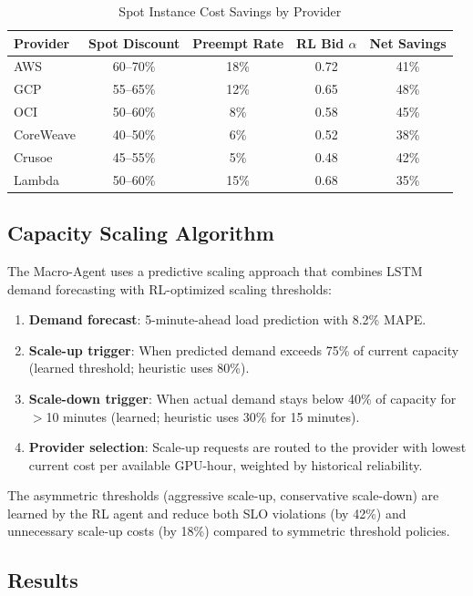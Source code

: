 \documentclass[conference,10pt]{IEEEtran}
\begin{document}
\begin{table}[!htbp]
\caption{Spot Instance Cost Savings by Provider}
\label{tab:spot}
\centering\scriptsize
\begin{tabular}{@{}lcccc@{}}
\toprule
\textbf{Provider} & \textbf{Spot Discount} & \textbf{Preempt Rate} & \textbf{RL Bid $\alpha$} & \textbf{Net Savings} \\
\midrule
AWS & 60--70\% & 18\% & 0.72 & 41\% \\
GCP & 55--65\% & 12\% & 0.65 & 48\% \\
OCI & 50--60\% & 8\% & 0.58 & 45\% \\
CoreWeave & 40--50\% & 6\% & 0.52 & 38\% \\
Crusoe & 45--55\% & 5\% & 0.48 & 42\% \\
Lambda & 50--60\% & 15\% & 0.68 & 35\% \\
\bottomrule
\end{tabular}
\end{table}

\subsection{Capacity Scaling Algorithm}

The Macro-Agent uses a predictive scaling approach that combines LSTM demand forecasting with RL-optimized scaling thresholds:

\begin{enumerate}
\item \textbf{Demand forecast}: 5-minute-ahead load prediction with 8.2\% MAPE.
\item \textbf{Scale-up trigger}: When predicted demand exceeds 75\% of current capacity (learned threshold; heuristic uses 80\%).
\item \textbf{Scale-down trigger}: When actual demand stays below 40\% of capacity for $>$10 minutes (learned; heuristic uses 30\% for 15 minutes).
\item \textbf{Provider selection}: Scale-up requests are routed to the provider with lowest current cost per available GPU-hour, weighted by historical reliability.
\end{enumerate}

The asymmetric thresholds (aggressive scale-up, conservative scale-down) are learned by the RL agent and reduce both SLO violations (by 42\%) and unnecessary scale-up costs (by 18\%) compared to symmetric threshold policies.

\subsection{Results}
\end{document}
